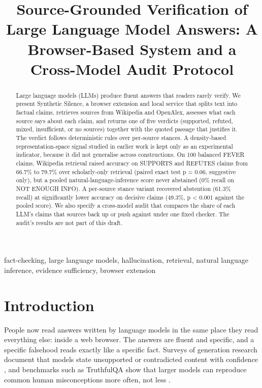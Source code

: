 \documentclass[conference]{IEEEtran}
\begin{document}
\title{Source-Grounded Verification of Large Language Model Answers: A Browser-Based System and a Cross-Model Audit Protocol}
\author{
\and
{}
}
\maketitle

\begin{abstract}
Large language models (LLMs) produce fluent answers that readers rarely verify. We present Synthetic Silence, a browser extension and local service that splits text into factual claims, retrieves sources from Wikipedia and OpenAlex, assesses what each source says about each claim, and returns one of five verdicts (supported, refuted, mixed, insufficient, or no sources) together with the quoted passage that justifies it. The verdict follows deterministic rules over per-source stances. A density-based representation-space signal studied in earlier work is kept only as an experimental indicator, because it did not generalise across constructions. On 100 balanced FEVER claims, Wikipedia retrieval raised accuracy on SUPPORTS and REFUTES claims from 66.7\% to 79.7\% over scholarly-only retrieval (paired exact test p = 0.06, suggestive only), but a pooled natural-language-inference score never abstained (0\% recall on NOT ENOUGH INFO). A per-source stance variant recovered abstention (61.3\% recall) at significantly lower accuracy on decisive claims (49.3\%, p < 0.001 against the pooled score). We also specify a cross-model audit that compares the share of each LLM's claims that sources back up or push against under one fixed checker. The audit's results are not part of this draft.
\end{abstract}

\begin{IEEEkeywords}
fact-checking, large language models, hallucination, retrieval, natural language inference, evidence sufficiency, browser extension
\end{IEEEkeywords}

\section{Introduction}
People now read answers written by language models in the same place they read everything else: inside a web browser. The answers are fluent and specific, and a specific falsehood reads exactly like a specific fact. Surveys of generation research document that models state unsupported or contradicted content with confidence \cite{ji2023}, and benchmarks such as TruthfulQA show that larger models can reproduce common human misconceptions more often, not less \cite{lin2022}.
\end{document}
